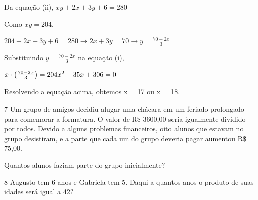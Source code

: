 \begin{escolha}
{{{\begin{escolha}
{{Da equação (ii),
$xy + 2x + 3y + 6 = 280$

Como $xy =204$,

$204 + 2x + 3y + 6 = 280 \rightarrow
2x + 3y = 70 \rightarrow
y = \frac{70-2x}{3}$

Substituindo $y = \frac{70-2x}{3}$ na equação (i),

$x \cdot \left ( \frac{70-2x}{3} \right ) = 204

x\textsuperscript{2} - 35x + 306 = 0$

Resolvendo a equação acima, obtemos x = 17 ou x = 18.}

\num{7} Um grupo de amigos decidiu alugar uma chácara em um feriado
prolongado para comemorar a formatura. O valor de R\$ 3600,00 seria igualmente
dividido por todos. Devido a alguns problemas financeiros, oito alunos
que estavam no grupo desistiram, e a parte que cada um do grupo deveria
pagar aumentou R\$ 75,00.

Quantos alunos faziam parte do grupo inicialmente?



\num{8} Augusto tem 6 anos e Gabriela tem 5. Daqui a quantos anos o produto
de suas idades será igual a 42?



}
\end{escolha}}}}
\end{escolha}
